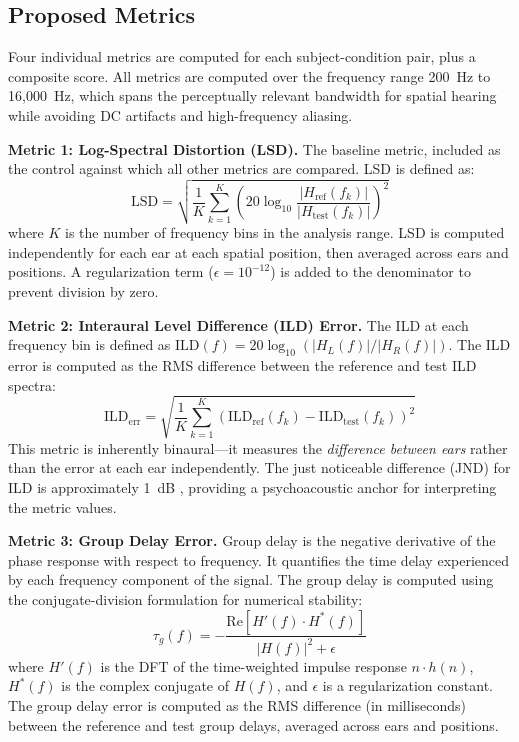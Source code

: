 \documentclass[12pt,a4paper]{article}
\begin{document}
\subsection{Proposed Metrics}

Four individual metrics are computed for each subject-condition pair, plus a composite score. All metrics are computed over the frequency range 200~Hz to 16{,}000~Hz, which spans the perceptually relevant bandwidth for spatial hearing while avoiding DC artifacts and high-frequency aliasing.

\textbf{Metric 1: Log-Spectral Distortion (LSD).}
The baseline metric, included as the control against which all other metrics are compared. LSD is defined as:
\begin{equation}
\mathrm{LSD} = \sqrt{\frac{1}{K} \sum_{k=1}^{K} \left( 20 \log_{10} \frac{|H_{\mathrm{ref}}(f_k)|}{|H_{\mathrm{test}}(f_k)|} \right)^2}
\label{eq:lsd}
\end{equation}
where $K$ is the number of frequency bins in the analysis range. LSD is computed independently for each ear at each spatial position, then averaged across ears and positions. A regularization term ($\epsilon = 10^{-12}$) is added to the denominator to prevent division by zero.

\textbf{Metric 2: Interaural Level Difference (ILD) Error.}
The ILD at each frequency bin is defined as $\mathrm{ILD}(f) = 20 \log_{10}(|H_L(f)| / |H_R(f)|)$. The ILD error is computed as the RMS difference between the reference and test ILD spectra:
\begin{equation}
\mathrm{ILD}_{\mathrm{err}} = \sqrt{\frac{1}{K} \sum_{k=1}^{K} \left( \mathrm{ILD}_{\mathrm{ref}}(f_k) - \mathrm{ILD}_{\mathrm{test}}(f_k) \right)^2}
\label{eq:ild}
\end{equation}
This metric is inherently binaural---it measures the \textit{difference between ears} rather than the error at each ear independently. The just noticeable difference (JND) for ILD is approximately 1~dB \cite{blauert1997}, providing a psychoacoustic anchor for interpreting the metric values.

\textbf{Metric 3: Group Delay Error.}
Group delay is the negative derivative of the phase response with respect to frequency. It quantifies the time delay experienced by each frequency component of the signal. The group delay is computed using the conjugate-division formulation for numerical stability:
\begin{equation}
\tau_g(f) = -\frac{\mathrm{Re}\left[ H'(f) \cdot H^*(f) \right]}{|H(f)|^2 + \epsilon}
\label{eq:gd}
\end{equation}
where $H'(f)$ is the DFT of the time-weighted impulse response $n \cdot h(n)$, $H^*(f)$ is the complex conjugate of $H(f)$, and $\epsilon$ is a regularization constant. The group delay error is computed as the RMS difference (in milliseconds) between the reference and test group delays, averaged across ears and positions.
\end{document}
